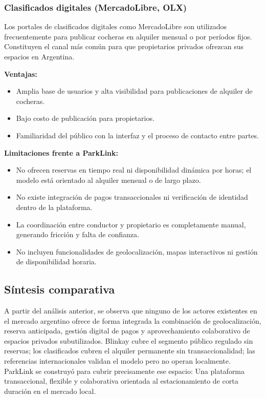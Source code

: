 \subsubsection{Clasificados digitales (MercadoLibre, OLX)}

Los portales de clasificados digitales como MercadoLibre \autocite{mercadolibre} son utilizados frecuentemente para publicar cocheras en alquiler mensual o por períodos fijos. Constituyen el canal más común para que propietarios privados ofrezcan sus espacios en Argentina.

\textbf{Ventajas:}
\begin{itemize}
    \item Amplia base de usuarios y alta visibilidad para publicaciones de alquiler de cocheras.
    \item Bajo costo de publicación para propietarios.
    \item Familiaridad del público con la interfaz y el proceso de contacto entre partes.
\end{itemize}

\textbf{Limitaciones frente a ParkLink:}
\begin{itemize}
    \item No ofrecen reservas en tiempo real ni disponibilidad dinámica por horas; el modelo está orientado al alquiler mensual o de largo plazo.
    \item No existe integración de pagos transaccionales ni verificación de identidad dentro de la plataforma.
    \item La coordinación entre conductor y propietario es completamente manual, generando fricción y falta de confianza.
    \item No incluyen funcionalidades de geolocalización, mapas interactivos ni gestión de disponibilidad horaria.
\end{itemize}

\subsection{Síntesis comparativa}

A partir del análisis anterior, se observa que ninguno de los actores existentes en el mercado argentino ofrece de forma integrada la combinación de geolocalización, reserva anticipada, gestión digital de pagos y aprovechamiento colaborativo de espacios privados subutilizados. Blinkay cubre el segmento público regulado sin reservas; los clasificados cubren el alquiler permanente sin transaccionalidad; las referencias internacionales validan el modelo pero no operan localmente. ParkLink se construyó para cubrir precisamente ese espacio: Una plataforma transaccional, flexible y colaborativa orientada al estacionamiento de corta duración en el mercado local.


